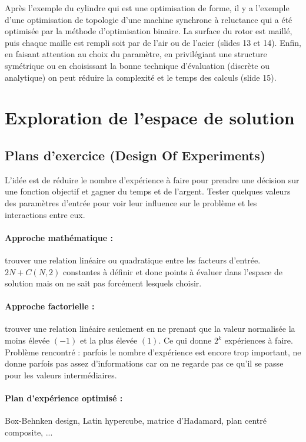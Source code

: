 Après l'exemple du cylindre qui est une optimisation de forme, il y a l'exemple d'une optimisation de topologie d'une machine synchrone à reluctance qui a été optimisée par la méthode d'optimisation binaire. La surface du rotor est maillé, puis chaque maille est rempli soit par de l'air ou de l'acier (slides 13 et 14). Enfin, en faisant attention au choix du paramètre, en privilégiant une structure symétrique ou en choisissant la bonne technique d'évaluation (discrète ou analytique) on peut réduire la complexité et le temps  des calculs (slide 15).

\section{Exploration de l'espace de solution}
\subsection{Plans d'exercice (Design Of Experiments)}
L'idée est de réduire le nombre d’expérience à faire pour prendre une décision sur une fonction objectif et gagner du temps et de l’argent. Tester quelques valeurs des paramètres d’entrée pour voir leur influence sur le problème et les interactions entre eux. 

\paragraph{Approche mathématique :} trouver une relation linéaire ou quadratique entre les facteurs d’entrée.
$2N + C(N,2)$ constantes à définir et donc points à évaluer dans l’espace de solution mais on ne sait pas forcément lesquels choisir.

\paragraph{Approche factorielle :} trouver une relation linéaire seulement en ne prenant que la valeur normalisée la moins élevée $(-1)$ et la plus élevée $(1)$.
Ce qui donne $2^k$ expériences à faire. Problème rencontré : parfois le nombre d’expérience est encore trop important, ne donne parfois pas assez d’informations car on ne regarde pas ce qu’il se passe pour les valeurs intermédiaires.

\paragraph{Plan d’expérience optimisé :} Box-Behnken design, Latin hypercube, matrice d’Hadamard, plan centré composite, ...

